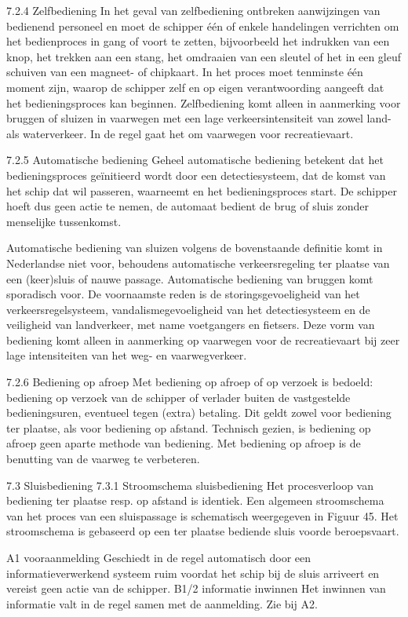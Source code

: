 7.2.4 Zelfbediening
In het geval van zelfbediening ontbreken aanwijzingen van bedienend personeel en moet de
schipper één of enkele handelingen verrichten om het bedienproces in gang of voort te zetten,
bijvoorbeeld het indrukken van een knop, het trekken aan een stang, het omdraaien van een
sleutel of het in een gleuf schuiven van een magneet- of chipkaart. In het proces moet tenminste één moment zijn, waarop de schipper zelf en op eigen verantwoording aangeeft dat
het bedieningsproces kan beginnen. Zelfbediening komt alleen in aanmerking voor bruggen of
sluizen in vaarwegen met een lage verkeersintensiteit van zowel land- als waterverkeer. In de
regel gaat het om vaarwegen voor recreatievaart.

7.2.5 Automatische bediening
Geheel automatische bediening betekent dat het bedieningsproces geïnitieerd wordt door een
detectiesysteem, dat de komst van het schip dat wil passeren, waarneemt en het bedieningsproces
start. De schipper hoeft dus geen actie te nemen, de automaat bedient de brug of sluis zonder
menselijke tussenkomst.


Automatische bediening van sluizen volgens de bovenstaande definitie komt in Nederlandse
niet voor, behoudens automatische verkeersregeling ter plaatse van een (keer)sluis of nauwe
passage.
Automatische bediening van bruggen komt sporadisch voor. De voornaamste reden is de
storingsgevoeligheid van het verkeersregelsysteem, vandalismegevoeligheid van het detectiesysteem en de veiligheid van landverkeer, met name voetgangers en fietsers. Deze vorm van
bediening komt alleen in aanmerking op vaarwegen voor de recreatievaart bij zeer lage
intensiteiten van het weg- en vaarwegverkeer.

7.2.6 Bediening op afroep
Met bediening op afroep of op verzoek is bedoeld: bediening op verzoek van de schipper of
verlader buiten de vastgestelde bedieningsuren, eventueel tegen (extra) betaling. Dit geldt
zowel voor bediening ter plaatse, als voor bediening op afstand. Technisch gezien, is bediening
op afroep geen aparte methode van bediening. Met bediening op afroep is de benutting van
de vaarweg te verbeteren.

7.3 Sluisbediening
7.3.1 Stroomschema sluisbediening
Het procesverloop van bediening ter plaatse resp. op afstand is identiek.
Een algemeen stroomschema van het proces van een sluispassage is schematisch weergegeven in Figuur 45. Het stroomschema is gebaseerd op een ter plaatse bediende sluis voorde beroepsvaart.

A1 vooraanmelding
Geschiedt in de regel automatisch door een informatieverwerkend systeem ruim voordat
het schip bij de sluis arriveert en vereist geen actie van de schipper.
B1/2 informatie inwinnen
Het inwinnen van informatie valt in de regel samen met de aanmelding. Zie bij A2.

